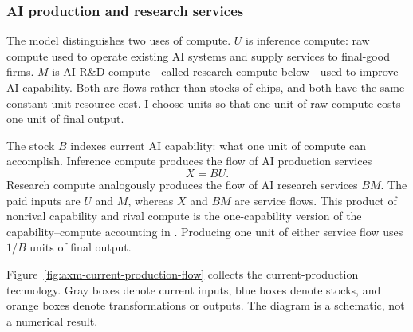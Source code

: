 \subsubsection{AI production and research services}

The model distinguishes two uses of compute. \(U\) is inference compute: raw
compute used to operate existing AI systems and supply services to final-good
firms. \(M\) is AI R\&D compute---called research compute below---used to improve
AI capability. Both are flows rather than stocks of chips, and both have the
same constant unit resource cost. I choose units so that one unit of raw compute
costs one unit of final output.

The stock \(B\) indexes current AI capability: what one unit of compute can
accomplish. Inference compute produces the flow of AI production services
\begin{equation}
 X=BU.
 \label{eq:axm-ai-service}
\end{equation}
Research compute analogously produces the flow of AI research services \(BM\).
The paid inputs are \(U\) and \(M\), whereas \(X\) and \(BM\) are service flows.
This product of nonrival capability and rival compute is the one-capability
version of the capability--compute accounting in \citet{davidsonetal2026}.
Producing one unit of either service flow uses \(1/B\) units of final output.

Figure~\ref{fig:axm-current-production-flow} collects the current-production
technology. Gray boxes denote current inputs, blue boxes denote stocks, and
orange boxes denote transformations or outputs. The diagram is a schematic,
not a numerical result.

